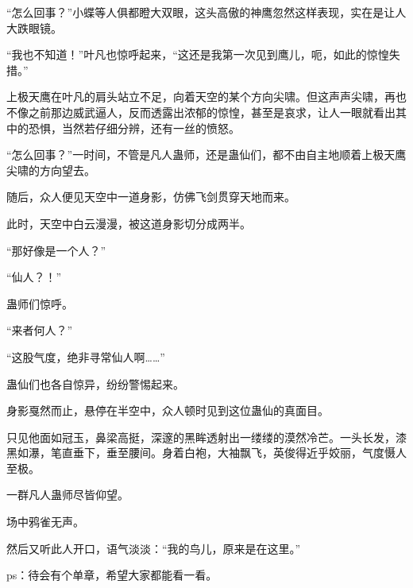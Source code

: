 \begin{this_body}
“怎么回事？”小蝶等人俱都瞪大双眼，这头高傲的神鹰忽然这样表现，实在是让人大跌眼镜。

“我也不知道！”叶凡也惊呼起来，“这还是我第一次见到鹰儿，呃，如此的惊惶失措。”

上极天鹰在叶凡的肩头站立不足，向着天空的某个方向尖啸。但这声声尖啸，再也不像之前那边威武逼人，反而透露出浓郁的惊惶，甚至是哀求，让人一眼就看出其中的恐惧，当然若仔细分辨，还有一丝的愤怒。

“怎么回事？”一时间，不管是凡人蛊师，还是蛊仙们，都不由自主地顺着上极天鹰尖啸的方向望去。

随后，众人便见天空中一道身影，仿佛飞剑贯穿天地而来。

此时，天空中白云漫漫，被这道身影切分成两半。

“那好像是一个人？”

“仙人？！”

蛊师们惊呼。

“来者何人？”

“这股气度，绝非寻常仙人啊……”

蛊仙们也各自惊异，纷纷警惕起来。

身影戛然而止，悬停在半空中，众人顿时见到这位蛊仙的真面目。

只见他面如冠玉，鼻梁高挺，深邃的黑眸透射出一缕缕的漠然冷芒。一头长发，漆黑如瀑，笔直垂下，垂至腰间。身着白袍，大袖飘飞，英俊得近乎姣丽，气度慑人至极。

一群凡人蛊师尽皆仰望。

场中鸦雀无声。

然后又听此人开口，语气淡淡：“我的鸟儿，原来是在这里。”

ps：待会有个单章，希望大家都能看一看。

\end{this_body}


